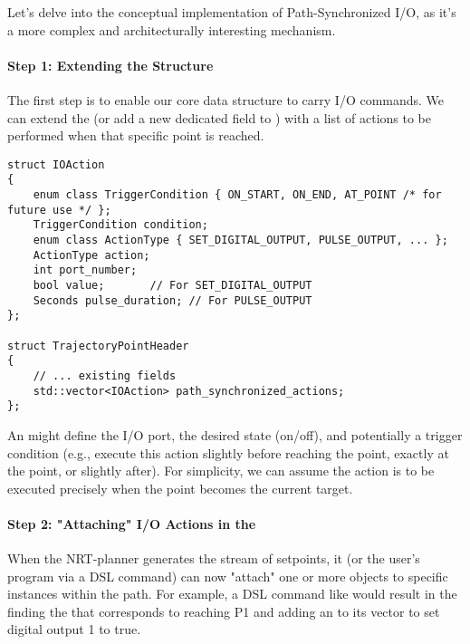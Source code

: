 Let's delve into the conceptual implementation of Path-Synchronized I/O, as it's a more complex and architecturally interesting mechanism.

\paragraph{Step 1: Extending the  Structure}
The first step is to enable our core data structure to carry I/O commands. We can extend the  (or add a new dedicated field to ) with a list of actions to be performed when that specific point is reached.

\begin{verbatim}
struct IOAction
{
    enum class TriggerCondition { ON_START, ON_END, AT_POINT /* for future use */ };
    TriggerCondition condition;
    enum class ActionType { SET_DIGITAL_OUTPUT, PULSE_OUTPUT, ... };
    ActionType action;
    int port_number;
    bool value;       // For SET_DIGITAL_OUTPUT
    Seconds pulse_duration; // For PULSE_OUTPUT
};

struct TrajectoryPointHeader
{
    // ... existing fields
    std::vector<IOAction> path_synchronized_actions;
};
\end{verbatim}
\label{lst:trajectorypoint-extension}

An  might define the I/O port, the desired state (on/off), and potentially a trigger condition (e.g., execute this action slightly before reaching the point, exactly at the point, or slightly after). For simplicity, we can assume the action is to be executed precisely when the point becomes the current target.

\paragraph{Step 2: "Attaching" I/O Actions in the }
When the NRT-planner generates the stream of setpoints, it (or the user's program via a DSL command) can now "attach" one or more  objects to specific  instances within the path.
For example, a DSL command like  would result in the  finding the  that corresponds to reaching P1 and adding an  to its  vector to set digital output 1 to true.

